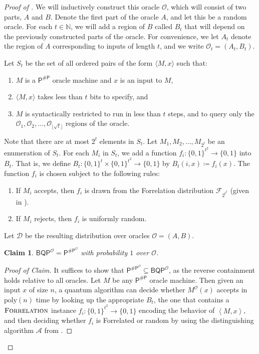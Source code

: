 \documentclass[11pt]{article}%
\newtheorem{claim}[theorem]{Claim}
\newcommand{\poly}{\mathrm{poly}}
\newcommand{\Forrelation}{\normalfont\textsc{Forrelation}}
\begin{document}
\begin{proof}[Proof of ]
We will inductively construct this oracle $\mathcal{O}$, which will consist of two parts, $A$ and $B$. Denote the first part of the oracle $A$, and let this be a random oracle. For each $t\in\mathbb{N}$, we will add a region of $B$ called $B_t$ that will depend on the previously constructed parts of the oracle.  For convenience, we let $A_t$ denote the region of $A$ corresponding to inputs of length $t$, and we write $\mathcal{O}_t = (A_t, B_t)$.

Let $S_t$ be the set of all ordered pairs of the form $\langle M, x \rangle$ such that:
\begin{enumerate}
\item $M$ is a $\mathsf{P^{\# P}}$ oracle machine and $x$ is an input to $M$,
\item $\langle M, x \rangle$ takes less than $t$ bits to specify, and
\item $M$ is syntactically restricted to run in less than $t$ steps, and to query only the $\mathcal{O}_1, \mathcal{O}_2, \ldots, \mathcal{O}_{\lfloor \sqrt{t} \rfloor}$ regions of the oracle.
\end{enumerate}
Note that there are at most $2^t$ elements in $S_t$. Let $M_1, M_2, \ldots, M_{2^t}$ be an enumeration of $S_t$. For each $M_i$ in $S_t$, we add a function $f_i: \{0,1\}^{t^2} \to \{0,1\}$ into $B_t$. That is, we define $B_t: \{0,1\}^t \times \{0,1\}^{t^2} \to \{0,1\}$ by $B_t(i, x) \coloneqq f_i(x)$. The function $f_i$ is chosen subject to the following rules:
\begin{enumerate}
\item If $M_i$ accepts, then $f_i$ is drawn from the Forrelation distribution $\mathcal{F}_{2^{t^2}}$ (given in ).
\item If $M_i$ rejects, then $f_i$ is uniformly random.
\end{enumerate}
Let $\mathcal{D}$ be the resulting distribution over oracles $\mathcal{O} = (A, B)$.

\begin{claim}
\label{claim:np_in_bqp}
$\mathsf{BQP}^\mathcal{O} = \mathsf{P}^{\mathsf{\# P}^\mathcal{O}}$ with probability $1$ over $\mathcal{O}$.
\end{claim}

\begin{proof}[Proof of Claim]
It suffices to show that $\mathsf{P}^{\mathsf{\# P}^\mathcal{O}} \subseteq \mathsf{BQP}^\mathcal{O}$, as the reverse containment holds relative to all oracles. Let $M$ be any $\mathsf{P}^{\mathsf{\# P}}$ oracle machine. Then given an input $x$ of size $n$, a quantum algorithm can decide whether $M^\mathcal{O}(x)$ accepts in $\poly(n)$ time by looking up the appropriate $B_t$, the one that contains a $\Forrelation$ instance $f_i: \{0,1\}^{t^2} \to \{0,1\}$ encoding the behavior of $\left<M,x\right>$, and then deciding whether $f_i$ is Forrelated or random by using the distinguishing algorithm $\mathcal{A}$ from .


\end{proof}
\end{proof}
\end{document}
